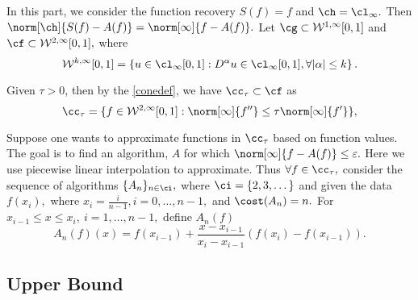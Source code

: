 
In this part, we consider the function recovery $S(f)=f$ and $\ch=\cl_{\infty}.$
Then $\norm[\ch]{S(f)-A(f)}=\norm[\infty]{f-A(f)}.$
Let $\cg \subset \mathcal{W}^{1,\infty}[0,1]$ and $\cf \subset \mathcal{W}^{2,\infty}[0,1],$ where
$$\mathcal{W}^{k,\infty}[0,1]=\left\{u \in \cl_{\infty}[0,1]:D^\alpha u \in \cl_\infty[0,1], \forall |\alpha| \leq k \right\}.$$

Given $\tau>0$, then by the \eqref{conedef}, we have $\cc_{\tau} \subset \cf$ as
\begin{equation}\label{taudef}
\cc_{\tau}=\{f \in  \mathcal{W}^{2,\infty}[0,1] : \norm[\infty]{f''}\leq \tau\norm[\infty]{f'}\},
\end{equation}

Suppose one wants to approximate functions in $\cc_{\tau}$ based on function values.  The goal is to find an algorithm, $A$ for which $\norm[\infty]{f-A(f)} \le \varepsilon.$ Here we use piecewise linear interpolation to approximate. Thus $\forall f \in \cc_{\tau},$ consider the sequence of algorithms $\{A_n\}_{n \in \ci},$ where
$\ci=\{2,3,\dots\}$
 and given the data $f(x_i),$ where $ x_i=\frac{i}{n-1}, i=0, \ldots,n-1,$ and $\cost(A_{n})=n.$
For $x_{i-1} \leq x \leq x_i, \ i=1, \ldots, n-1,$ define $A_{n}(f)$
$$A_{n}(f)(x)=f(x_{i-1})+\frac{x-x_{i-1}}{x_i-x_{i-1}}\left(f(x_i)-f(x_{i-1})\right).$$

\subsection{Upper Bound}


